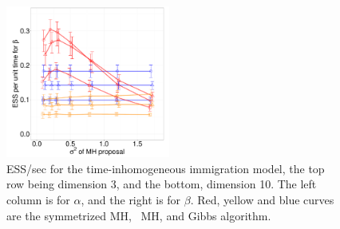 {\begin{figure}
\begin{minipage}[!hp]{0.8\linewidth}
    \includegraphics [width=0.480\textwidth, angle=0]{figures_new_apr12/CQ_beta_dim10_18apr12.pdf}
  \end{minipage}
  \begin{minipage}[!hp]{0.19\linewidth}
    \caption{ESS/sec for the time-inhomogeneous immigration model, the top row 
      being dimension 3, and the bottom,
      dimension 10. The left column is for $\alpha$, and the 
    right is for $\beta$. Red, yellow and blue curves are the symmetrized MH,
  \naive\ MH, and Gibbs algorithm.}
     \label{fig:ESS_pc_10}
  \end{minipage}
  \end{figure}

}
